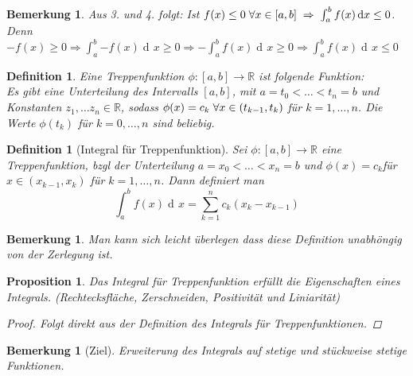 \documentclass[a4paper,titlepage,oneside]{article}
\def\R{\ensuremath{\mathbb{R}} }
\newcommand{\der}{\operatorname{d\!}{}}
\def\fa{\ensuremath{\forall}}
\def\sp{\hspace{0,1cm}}
\newcommand{\integral}[4][x]{\ensuremath{\int_{#2}^{#3}{#4\der #1}}}
\newcommand{\intAB}[2][x]{\integral[#1]{a}{b}{#2}}
\theoremstyle{thmstyle}
\newtheorem{prop}[satz]{Proposition}
\newtheorem{defi}[satz]{Definition}
\newtheorem{bem}[satz]{Bemerkung}
\theoremstyle{subthmstyle}
\begin{document}
\begin{bem}
Aus 3. und 4. folgt: Ist $ f(x) \le 0 \sp \fa x \in [a,b] \sp \Rightarrow \sp \intAB{f(x)} \le 0$. Denn $-f(x) \ge 0 \Rightarrow \intAB{-f(x)} \ge 0 \Rightarrow -\intAB{f(x)} \ge 0 \Rightarrow \intAB{f(x)} \le 0$
\end{bem}

\begin{defi}
Eine Treppenfunktion $\phi : [a,b] \to \R$ ist folgende Funktion: \\
Es gibt eine Unterteilung des Intervalls $[a,b]$, mit $a = t_0 < \dots < t_n = b$ und Konstanten $ z_1, \dots z_n \in \R$, sodass $\phi(x) = c_k \sp \fa x\in (t_{k-1},t_k) $ für $k = 1,\dots, n$. Die Werte $\phi(t_k) $ für $k = 0,\dots, n$ sind beliebig.
\end{defi}

\begin{defi}[Integral für Treppenfunktion]
Sei $\phi : [a,b] \to \R$ eine Treppenfunktion, bzgl der Unterteilung $a = x_0 < \dots < x_n = b$ und $\phi(x) = c_k $für $x \in (x_{k-1}, x_k) $ für $k = 1,\dots, n$. Dann definiert man \[ \intAB{f(x)} = \sum_{k=1}^{n}{c_k(x_k - x_{k-1})} \]
\end{defi}

\begin{bem}
Man kann sich leicht überlegen dass diese Definition unabhöngig von der Zerlegung ist.
\end{bem}

\begin{prop}
Das Integral für Treppenfunktion erfüllt die Eigenschaften eines Integrals. (Rechtecksfläche, Zerschneiden, Positivität und Liniarität)
\begin{proof} Folgt direkt aus der Definition des Integrals für Treppenfunktionen.
\end{proof}
\end{prop}

\begin{bem}[Ziel]
Erweiterung des Integrals auf stetige und stückweise stetige Funktionen.
\end{bem}
\end{document}
